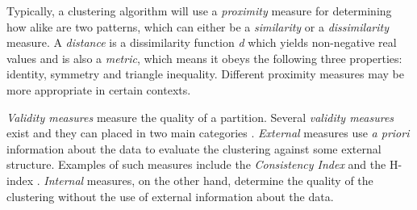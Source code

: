 
Typically, a clustering algorithm will use a \emph{proximity} measure for determining how alike are two patterns, which can either be a \emph{similarity} or a \emph{dissimilarity} measure.
A \emph{distance} is a dissimilarity function \emph{d} which yields non-negative real values and is also a \emph{metric}, which means it obeys the following three properties: identity, symmetry and triangle inequality.
Different proximity measures may be more appropriate in certain contexts.



\emph{Validity measures} measure the quality of a partition.
Several \emph{validity measures} exist and they can placed in two main categories \cite{Aggarwal2014}.
\emph{External} measures use \emph{a priori} information about the data to evaluate the clustering against some external structure.
Examples of such measures include the \emph{Consistency Index} \cite{Fred2001} and the H-index \cite{Meila2003}. %
\emph{Internal} measures, on the other hand, determine the quality of the clustering without the use of external information about the data.



